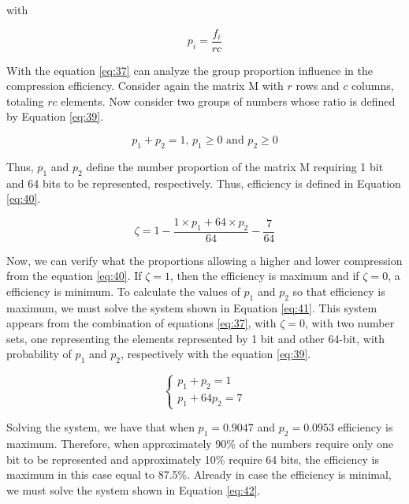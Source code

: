 \documentclass[10pt]{article}
\begin{document}
\noindent with

\begin{equation}\label{eq:38}
 p_i = \frac{f_i}{rc}
\end{equation}

With the equation \ref{eq:37} can analyze the group proportion influence in the compression efficiency. Consider again the matrix M with $r$ rows and $c$ columns, totaling $rc$ elements. Now consider two groups of numbers whose ratio is defined by Equation \ref{eq:39}.

\begin{equation} \label{eq:39}
 p_1 + p_2= 1\text{, } p_1 \geq 0 \text{ and } p_2 \geq 0
\end{equation}

\noindent Thus, $p_1$ and $p_2$ define the number proportion of the matrix M requiring 1 bit and 64 bits to be represented, respectively. Thus, efficiency is defined in Equation \ref{eq:40}.

\begin{equation}\label{eq:40}
 \zeta = 1 - \frac{1 \times p_1  + 64 \times p_2}{64} - \frac{7}{64} 
\end{equation}

Now, we can verify what the proportions allowing a higher and lower compression from the equation \ref{eq:40}. If $\zeta=1$, then the efficiency is maximum and if $\zeta=0$, a efficiency is minimum. To calculate the values ​​of $p_1$ and $p_2$ so that efficiency is maximum, we must solve the system shown in Equation \ref{eq:41}. This system appears from the combination of equations \ref{eq:37}, with $\zeta=0$, with two number sets, one representing the elements represented by 1 bit and other  64-bit, with probability of $p_1$ and $p_2$, respectively with the equation \ref{eq:39}.

\begin{equation}\label{eq:41}
  \left
  \{\begin{matrix}
    p_1 + p_2 = 1\\ 
    p_1+64p_2 = 7
  \end{matrix}
  \right.
\end{equation}

Solving the system, we have that when $p_1=0.9047$ and $p_2=0.0953$ efficiency is maximum. Therefore, when approximately 90\% of the numbers require only one bit to be represented and approximately 10\% require 64 bits, the efficiency is maximum in this case equal to 87.5\%. Already in case the efficiency is minimal, we must solve the system shown in Equation \ref{eq:42}.
\end{document}

